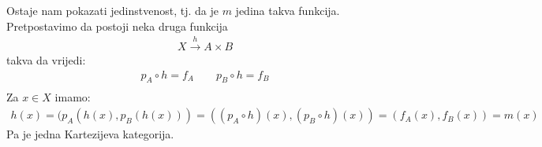 {\begin{center}
  \end{center}
  Ostaje nam pokazati jedinstvenost, tj. da je $m$ jedina takva funkcija.
  Pretpostavimo da postoji neka druga funkcija
  \begin{align*}
    X \xrightarrow{h} A \times B
  \end{align*}
  takva da  vrijedi:
  \begin{align*}
    p_A \circ h = f_A \qquad p_B \circ h = f_B\\
  \end{align*}
  Za $x \in X$ imamo:
  \begin{align*}
    h(x) = (p_A(h(x), p_B(h(x))) = ((p_A \circ h )(x), (p_B \circ h)(x)) =
    (f_A(x), f_B(x)) = m(x)
  \end{align*}
  Pa je  jedna Kartezijeva kategorija.
  }
  \newpage

